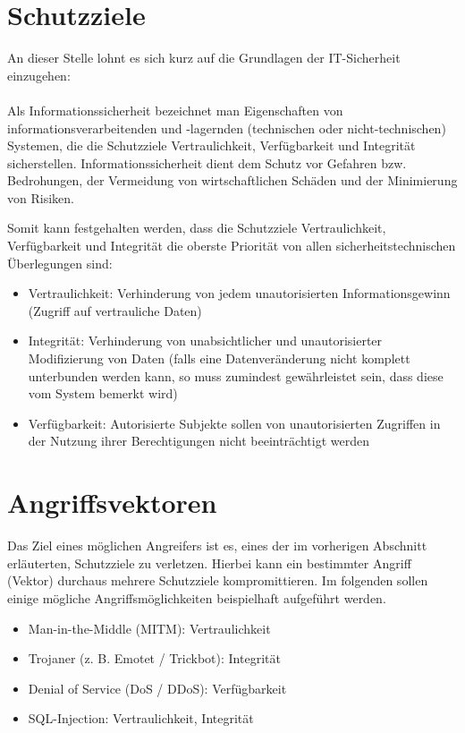 \documentclass[12pt,a4paper,parskip=half]{scrreprt}
\begin{document}
		\section{Schutzziele}
			
			An dieser Stelle lohnt es sich kurz auf die Grundlagen der IT-Sicherheit einzugehen: \\ \\
			\glqq{}Als Informationssicherheit bezeichnet man Eigenschaften von informationsverarbeitenden und -lagernden (technischen oder nicht-technischen) Systemen, die die
			Schutzziele Vertraulichkeit, Verfügbarkeit und Integrität sicherstellen.
			Informationssicherheit dient dem Schutz vor Gefahren bzw. Bedrohungen, der Vermeidung von wirtschaftlichen Schäden und der Minimierung von Risiken.\grqq{} \cite{ScriptITSicherheit}
			
			Somit kann festgehalten werden, dass die Schutzziele Vertraulichkeit, Verfügbarkeit und Integrität die oberste Priorität von allen sicherheitstechnischen Überlegungen sind:
			
			\begin{itemize}
				\item Vertraulichkeit: Verhinderung von jedem unautorisierten Informationsgewinn (Zugriff auf vertrauliche Daten)
				\item Integrität: Verhinderung von unabsichtlicher und unautorisierter Modifizierung von Daten (falls eine Datenveränderung nicht komplett unterbunden werden kann, so muss zumindest gewährleistet sein, dass diese vom System bemerkt wird)
				\item Verfügbarkeit: Autorisierte Subjekte sollen von unautorisierten Zugriffen in der Nutzung ihrer Berechtigungen nicht beeinträchtigt werden
			\end{itemize}
			
		\section{Angriffsvektoren}
			
			Das Ziel eines möglichen Angreifers ist es, eines der im vorherigen Abschnitt erläuterten, Schutzziele zu verletzen. Hierbei kann ein bestimmter Angriff (Vektor) durchaus mehrere Schutzziele kompromittieren. Im folgenden sollen einige mögliche Angriffsmöglichkeiten beispielhaft aufgeführt werden.
			
			\begin{itemize}
				\item Man-in-the-Middle (MITM): Vertraulichkeit
				\item Trojaner (z. B. Emotet / Trickbot): Integrität
				\item Denial of Service (DoS / DDoS): Verfügbarkeit
				\item SQL-Injection: Vertraulichkeit, Integrität
			\end{itemize}
			
\end{document}
